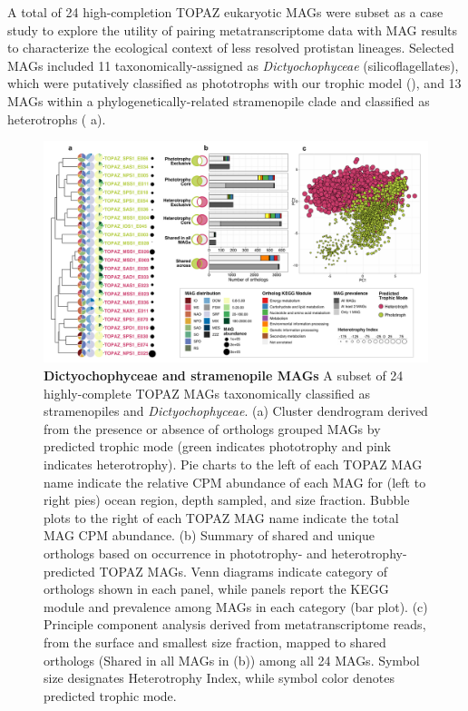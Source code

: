 \documentclass[12pt]{article}
\numberwithin{equation}{section}
\begin{document}
A total of 24 high-completion TOPAZ eukaryotic MAGs were subset as a case study to explore the utility of pairing metatranscriptome data with MAG results to characterize the ecological context of less resolved protistan lineages. Selected MAGs included 11 taxonomically-assigned as \textit{Dictyochophyceae} (silicoflagellates), which were putatively classified as phototrophs with our trophic model (), and 13 MAGs within a phylogenetically-related stramenopile clade and classified as heterotrophs ( a). 


\begin{figure}[t!]    
    \centering
    \includegraphics[width = \columnwidth]{figures/Figure5-panel-plot-stramenopile-H.png}
    \caption{ \textbf{Dictyochophyceae and stramenopile MAGs} A subset of 24 highly-complete TOPAZ MAGs taxonomically classified as stramenopiles and \textit{Dictyochophyceae}. (a) Cluster dendrogram derived from the presence or absence of orthologs grouped MAGs by predicted trophic mode (green indicates phototrophy and pink indicates heterotrophy). Pie charts to the left of each TOPAZ MAG name indicate the relative CPM abundance of each MAG for (left to right pies) ocean region, depth sampled, and size fraction. Bubble plots to the right of each TOPAZ MAG name indicate the total MAG CPM abundance. (b) Summary of shared and unique orthologs based on occurrence in phototrophy- and heterotrophy-predicted TOPAZ MAGs. Venn diagrams indicate category of orthologs shown in each panel, while panels report the KEGG module and prevalence among MAGs in each category (bar plot). (c) Principle component analysis derived from metatranscriptome reads, from the surface and smallest size fraction, mapped to shared orthologs (Shared in all MAGs in (b)) among all 24 MAGs. Symbol size designates Heterotrophy Index, while symbol color denotes predicted trophic mode. 
    }
    \label{fig:fig5-dicty}
\end{figure}
\end{document}
